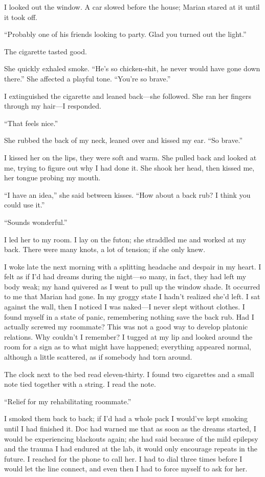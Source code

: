 \documentclass[
]{article}
\begin{document}
I looked out the window. A car slowed before the house; Marian stared at
it until it took off.

``Probably one of his friends looking to party. Glad you turned out the
light.''

The cigarette tasted good.

She quickly exhaled smoke. ``He's so chicken-shit, he never would have
gone down there.'' She affected a playful tone. ``You're so brave.''

I extinguished the cigarette and leaned back---she followed. She ran her
fingers through my hair---I responded.

``That feels nice.''

She rubbed the back of my neck, leaned over and kissed my ear. ``So
brave.''

I kissed her on the lips, they were soft and warm. She pulled back and
looked at me, trying to figure out why I had done it. She shook her
head, then kissed me, her tongue probing my mouth.

``I have an idea,'' she said between kisses. ``How about a back rub? I
think you could use it.''

``Sounds wonderful.''

I led her to my room. I lay on the futon; she straddled me and worked at
my back. There were many knots, a lot of tension; if she only knew.

I woke late the next morning with a splitting headache and despair in my
heart. I felt as if I'd had dreams during the night---so many, in fact,
they had left my body weak; my hand quivered as I went to pull up the
window shade. It occurred to me that Marian had gone. In my groggy state
I hadn't realized she'd left. I sat against the wall, then I noticed I
was naked---I never slept without clothes. I found myself in a state of
panic, remembering nothing save the back rub. Had I actually screwed my
roommate? This was not a good way to develop platonic relations. Why
couldn't I remember? I tugged at my lip and looked around the room for a
sign as to what might have happened; everything appeared normal,
although a little scattered, as if somebody had torn around.

The clock next to the bed read eleven-thirty. I found two cigarettes and
a small note tied together with a string. I read the note.

``Relief for my rehabilitating roommate.''

I smoked them back to back; if I'd had a whole pack I would've kept
smoking until I had finished it. Doc had warned me that as soon as the
dreams started, I would be experiencing blackouts again; she had said
because of the mild epilepsy and the trauma I had endured at the lab, it
would only encourage repeats in the future. I reached for the phone to
call her. I had to dial three times before I would let the line connect,
and even then I had to force myself to ask for her.
\end{document}
